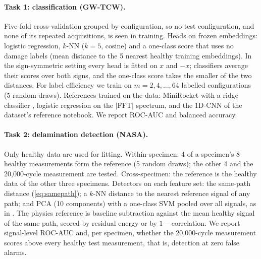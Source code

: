 \documentclass{article}
\newcommand{\fft}{$|$FFT$|$}
\begin{document}
\paragraph{Task 1: classification (GW-TCW).}
Five-fold cross-validation grouped by configuration, so no test configuration, and none of its repeated
acquisitions, is seen in training.
Heads on frozen embeddings: logistic regression, $k$-NN ($k=5$, cosine) and a one-class score that uses no
damage labels (mean distance to the 5 nearest healthy training embeddings). In the sign-symmetric setting
every head is fitted on $x$ and $-x$; classifiers average their scores over both signs, and the one-class
score takes the smaller of the two distances. For label efficiency we train on
$m=2,4,\dots,64$ labelled configurations (5 random draws). References trained on the data: MiniRocket with
a ridge classifier \citep{dempster2021minirocket}, logistic regression on the \fft{} spectrum, and the 1D-CNN
of the dataset's reference notebook. We report ROC-AUC and balanced accuracy.

\paragraph{Task 2: delamination detection (NASA).}
Only healthy data are used for fitting. Within-specimen: 4 of a specimen's 8 healthy measurements form
the reference (5 random draws); the other 4 and the 20{,}000-cycle measurement are tested.
Cross-specimen: the reference is the healthy data of the other three specimens. Detectors on each feature
set: the same-path distance (\cref{eq:samepath}); a $k$-NN distance to the nearest reference signal of any
path; and PCA (10 components) with a one-class SVM pooled over all signals, as in
\citet{rautela2022delamination}. The physics reference is baseline subtraction against the mean healthy
signal of the same path, scored by residual energy or by $1-$correlation. We report signal-level ROC-AUC
and, per specimen, whether the 20{,}000-cycle measurement scores above every healthy test measurement,
that is, detection at zero false alarms.
\end{document}
